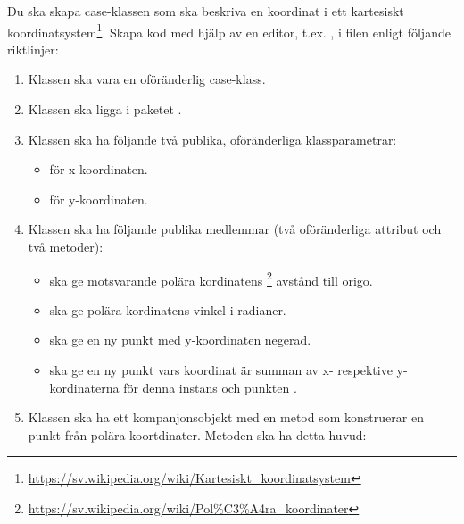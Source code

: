 \Task Du ska skapa case-klassen  som ska beskriva en koordinat i ett kartesiskt koordinatsystem\footnote{\url{https://sv.wikipedia.org/wiki/Kartesiskt_koordinatsystem}}. Skapa kod med hjälp av en editor, t.ex. , i filen   enligt följande riktlinjer:
\begin{enumerate}%
\item Klassen  ska vara en oföränderlig case-klass. 

\item Klassen  ska ligga i paketet .

\item Klassen  ska ha följande två publika, oföränderliga klassparametrar:
\begin{itemize}[nolistsep, noitemsep]
\item {} för x-koordinaten.
\item {} för y-koordinaten.
\end{itemize}

\item Klassen  ska ha följande publika medlemmar (två oföränderliga attribut och två metoder):
\begin{itemize}[nolistsep, noitemsep]
\item {} ska ge motsvarande polära kordinatens%
\footnote{\url{https://sv.wikipedia.org/wiki/Pol\%C3\%A4ra\_koordinater}}
 avstånd till origo.
\item {} ska ge polära kordinatens vinkel i radianer.
\item {} ska ge en ny punkt med y-koordinaten negerad. 
\item {} ska ge en ny punkt vars koordinat är summan av x- respektive y-kordinaterna för denna instans och punkten .
\end{itemize}

\item Klassen  ska ha ett kompanjonsobjekt med en metod som konstruerar en punkt från polära koortdinater. Metoden ska ha detta huvud: \\

\end{enumerate}

